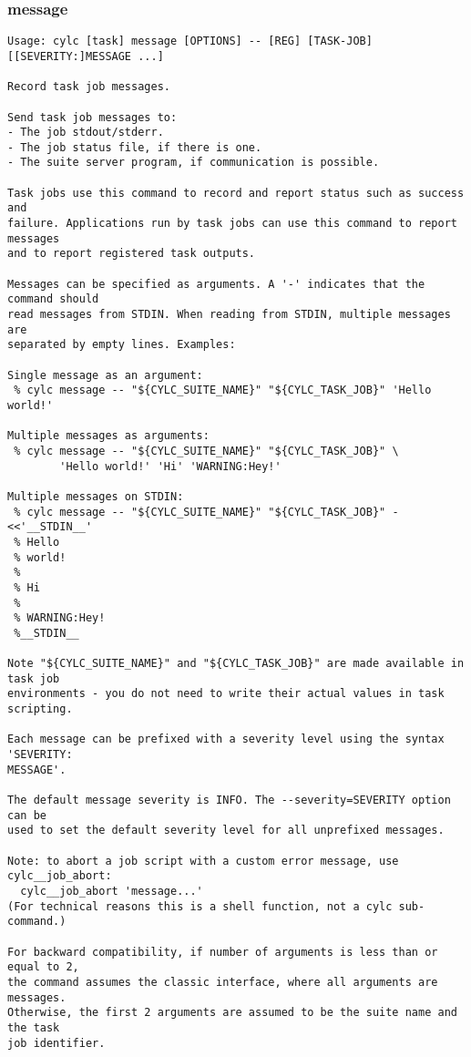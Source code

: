 \subsubsection{message}
\label{message}
\begin{lstlisting}
Usage: cylc [task] message [OPTIONS] -- [REG] [TASK-JOB] [[SEVERITY:]MESSAGE ...] 

Record task job messages.

Send task job messages to:
- The job stdout/stderr.
- The job status file, if there is one.
- The suite server program, if communication is possible.

Task jobs use this command to record and report status such as success and
failure. Applications run by task jobs can use this command to report messages
and to report registered task outputs.

Messages can be specified as arguments. A '-' indicates that the command should
read messages from STDIN. When reading from STDIN, multiple messages are
separated by empty lines. Examples:

Single message as an argument:
 % cylc message -- "${CYLC_SUITE_NAME}" "${CYLC_TASK_JOB}" 'Hello world!'

Multiple messages as arguments:
 % cylc message -- "${CYLC_SUITE_NAME}" "${CYLC_TASK_JOB}" \
        'Hello world!' 'Hi' 'WARNING:Hey!'

Multiple messages on STDIN:
 % cylc message -- "${CYLC_SUITE_NAME}" "${CYLC_TASK_JOB}" - <<'__STDIN__'
 % Hello
 % world!
 %
 % Hi
 %
 % WARNING:Hey!
 %__STDIN__

Note "${CYLC_SUITE_NAME}" and "${CYLC_TASK_JOB}" are made available in task job
environments - you do not need to write their actual values in task scripting.

Each message can be prefixed with a severity level using the syntax 'SEVERITY:
MESSAGE'.

The default message severity is INFO. The --severity=SEVERITY option can be
used to set the default severity level for all unprefixed messages.

Note: to abort a job script with a custom error message, use cylc__job_abort:
  cylc__job_abort 'message...'
(For technical reasons this is a shell function, not a cylc sub-command.)

For backward compatibility, if number of arguments is less than or equal to 2,
the command assumes the classic interface, where all arguments are messages.
Otherwise, the first 2 arguments are assumed to be the suite name and the task
job identifier.



\end{lstlisting}
